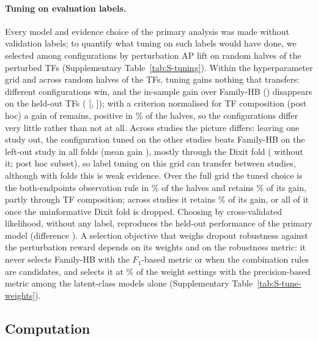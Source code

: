 \paragraph{Tuning on evaluation labels.}
Every model and evidence choice of the primary analysis was made without validation labels; to quantify what tuning on such labels would have done, we selected among \nTuneNConfigs{} configurations by perturbation AP lift on random halves of the perturbed TFs (Supplementary Table~\ref{tab:S-tuning}).
Within the hyperparameter grid and across random halves of the TFs, tuning gains nothing that transfers: \nTuneNwin{} different configurations win, and the in-sample gain over Family-HB (\nTuneIn{}) disappears on the held-out TFs (\nTuneOut{} [\nTuneOutLo{}, \nTuneOutHi{}]); with a criterion normalised for TF composition (post hoc) a gain of \nTuneNullOut{} remains, positive in \nTuneNullFracPct{}\% of the halves, so the configurations differ very little rather than not at all.
Across studies the picture differs: leaving one study out, the configuration tuned on the other studies beats Family-HB on the left-out study in all \nTuneLosoHbNfold{} folds (mean gain \nTuneLosoHbOut{}), mostly through the Dixit fold (\nTuneLosoHbExcl{} without it; post hoc subset), so label tuning on this grid can transfer between studies, although with \nTuneLosoHbNfold{} folds this is weak evidence.
Over the full grid the tuned choice is the both-endpoints observation rule in \nTuneAllFreqPct{}\% of the halves and retains \nTuneAllRetPct{}\% of its gain, partly through TF composition; across studies it retains \nTuneLosoPct{}\% of its gain, or all of it once the uninformative Dixit fold is dropped.
Choosing by cross-validated likelihood, without any label, reproduces the held-out performance of the primary model (difference \nTuneLf{}).
A selection objective that weighs dropout robustness against the perturbation reward depends on its weights and on the robustness metric: it never selects Family-HB with the $F_1$-based metric or when the combination rules are candidates, and selects it at \nTuneJointHbPrecPct{}\% of the weight settings with the precision-based metric among the latent-class models alone (Supplementary Table~\ref{tab:S-tune-weights}).

\subsection{Computation}\label{sec:res-compute}

